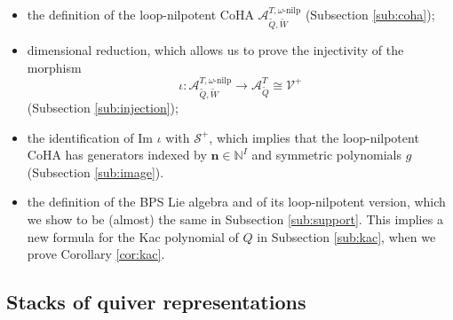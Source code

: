 \documentclass{amsart}
\def\CS{{\mathcal{S}}}
\def\CV{{\mathcal{V}}}
\def\nn{{\mathbb{N}^I}}
\def\bn{{\boldsymbol{n}}}
\def\tQ{\tilde{Q}}
\def\tW{\tilde{W}}
\def\kha{\mathcal{A}^{T,\omega\text{-nilp}}_{\tQ,\tW}}
\def\kzero{\mathcal{A}^{T}_{\tQ}}
\begin{document}
\begin{itemize}[leftmargin=*]

\item the definition of the loop-nilpotent CoHA $\kha$ (Subsection \ref{sub:coha});

\medskip 

\item dimensional reduction, which allows us to prove the injectivity of the morphism
$$
\iota : \kha \rightarrow \kzero \cong \CV^+
$$
(Subsection \ref{sub:injection});

\medskip 

\item the identification of $\text{Im }\iota$ with $\CS^+$, which implies that the loop-nilpotent CoHA has generators indexed by $\bn \in \nn$ and symmetric polynomials $g$ (Subsection \ref{sub:image}).

\medskip 

\item the definition of the BPS Lie algebra and of its loop-nilpotent version, which we show to be (almost) the same in Subsection \ref{sub:support}. This implies a new formula for the Kac polynomial of $Q$ in Subsection \ref{sub:kac}, when we prove Corollary \ref{cor:kac}.

\end{itemize}

\medskip 

\subsection{Stacks of quiver representations}
\label{sub:quiver}
\end{document}
